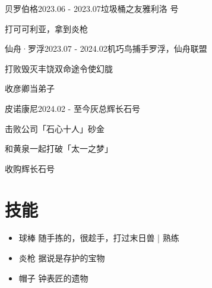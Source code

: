 \documentclass{plain-cv} %
\begin{document}
\begin{rSubsection}
    {贝罗伯格}{2023.06 - 2023.07}{垃圾桶之友}{雅利洛  号}
    \item 打可可利亚，拿到炎枪
\end{rSubsection}

\begin{rSubsection}
    {仙舟·罗浮}{2023.07 - 2024.02}{机巧鸟捕手}{罗浮，仙舟联盟}
    \item 打败毁灭丰饶双命途令使幻胧
    \item 收彦卿当弟子
\end{rSubsection}

\begin{rSubsection}
    {皮诺康尼}{2024.02 - 至今}{灰总}{辉长石号}
    \item 击败公司「石心十人」砂金
    \item 和黄泉一起打破「太一之梦」
    \item 收购辉长石号
\end{rSubsection}
\section{技能}

\begin{itemize}
    \item 球棒 \hfill 随手拣的，很趁手，打过末日兽 | 熟练
    \item 炎枪 \hfill 据说是存护的宝物
    \item 帽子 \hfill 钟表匠的遗物
\end{itemize}
\end{document}
